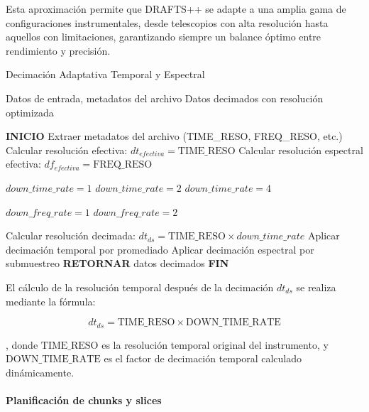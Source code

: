 Esta aproximación permite que DRAFTS++ se adapte a una amplia gama de configuraciones instrumentales, desde telescopios con alta resolución hasta aquellos con limitaciones, garantizando siempre un balance óptimo entre rendimiento y precisión.

\begin{algorithm}[H]
\caption{Decimación Adaptativa Temporal y Espectral}
\label{alg:adaptive-decimation}
\begin{algorithmic}[1]
\Require Datos de entrada, metadatos del archivo
\Ensure Datos decimados con resolución optimizada

\State \textbf{INICIO}
\State Extraer metadatos del archivo (TIME\_RESO, FREQ\_RESO, etc.)
\State Calcular resolución efectiva: $dt_{efectiva} = \text{TIME\_RESO}$
\State Calcular resolución espectral efectiva: $df_{efectiva} = \text{FREQ\_RESO}$

    \State $down\_time\_rate = 1$ 
    \State $down\_time\_rate = 2$ 
\Else
    \State $down\_time\_rate = 4$ 
\EndIf

    \State $down\_freq\_rate = 1$ 
\Else
    \State $down\_freq\_rate = 2$ 
\EndIf

\State Calcular resolución decimada: $dt_{ds} = \text{TIME\_RESO} \times down\_time\_rate$
\State Aplicar decimación temporal por promediado
\State Aplicar decimación espectral por submuestreo
\State \textbf{RETORNAR} datos decimados
\State \textbf{FIN}
\end{algorithmic}
\end{algorithm}

El cálculo de la resolución temporal después de la decimación $dt_{ds}$ se realiza mediante la fórmula:

\[
dt_{ds} = \text{TIME\_RESO} \times \text{DOWN\_TIME\_RATE}
\]

, donde $\text{TIME\_RESO}$ es la resolución temporal original del instrumento, y $\text{DOWN\_TIME\_RATE}$ es el factor de decimación temporal calculado dinámicamente.

\paragraph{Planificación de chunks y slices}\label{sec:chunk-slice-planning}

